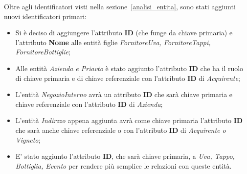 Oltre agli identificatori visti nella sezione~\ref{analisi_entita}, sono stati aggiunti nuovi identificatori primari:

\begin{itemize}
	\item Si è deciso di aggiungere l'attributo \textbf{ID} (che funge da chiave primaria) e l'attributo \textbf{Nome} alle entità figlie \emph{FornitoreUva, FornitoreTappi, FornitoreBottiglie};
	\item Alle entità \emph{Azienda e Priavto} è stato aggiunto l'attributo \textbf{ID} che ha il ruolo di chiave primaria e di chiave referenziale con l'attributo \textbf{ID} di \emph{Acquirente};
	\item L'entità \emph{NegozioInterno} avrà un attributo \textbf{ID} che sarà chiave primaria e chiave referenziale con l'attributo \textbf{ID} di \emph{Azienda};
	\item L'entità \emph{Indirzzo} appena aggiunta avrà come chiave primaria l'attributo \textbf{ID} che sarà anche chiave referenziale o con l'attributo \textbf{ID} di \emph{Acquirente o Vigneto};
	\item E' stato aggiunto l'attributo \textbf{ID}, che sarà chiave primaria, a \emph{Uva, Tappo, Bottiglia, Evento} per rendere più semplice le relazioni con queste entità.
\end{itemize}